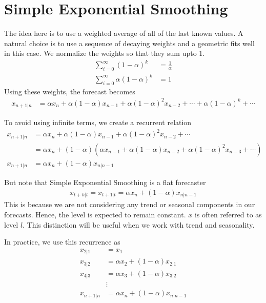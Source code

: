 \documentclass[../../time_series_notes.tex]{subfiles}
\begin{document}
\section{Simple Exponential Smoothing}
The idea here is to use a weighted average of all of the last known values. A natural choice is to use a sequence of decaying weights and a geometric fits well in this case. We normalize the weights so that they sum upto 1.
\begin{align*}
    \sum_{i=0}^{\infty} (1-\alpha)^{k} &= \frac{1}{\alpha}\\
    \sum_{i=0}^{\infty} \alpha(1-\alpha)^{k} &= 1
\end{align*}
Using these weights, the forecast becomes
\begin{align*}
    x_{n+1|n} &= \alpha x_{n} + \alpha(1-\alpha)x_{n-1} + \alpha(1-\alpha)^{2}x_{n-2} + \cdots + \alpha(1-\alpha)^{k} + \cdots
\end{align*}

To avoid using infinite terms, we create a recurrent relation
\begin{align*}
    x_{n+1|n} &= \alpha x_{n} + \alpha(1-\alpha)x_{n-1} + \alpha(1-\alpha)^{2}x_{n-2} + \cdots\\
    &= \alpha x_{n} + (1-\alpha)(\alpha x_{n-1} + \alpha(1-\alpha)x_{n-2} + \alpha(1-\alpha)^{2}x_{n-3} + \cdots)\\
    x_{n+1|n} &= \alpha x_{n} + (1-\alpha)x_{n|n-1}
\end{align*}

But note that Simple Exponential Smoothing is a flat forecaster
\begin{align*}
    x_{t+h|t} = x_{t+1|t} = \alpha x_{n} + (1-\alpha)x_{n|n-1}
\end{align*}
This is because we are not considering any trend or seasonal components in our forecasts. Hence, the level is expected to remain constant. $x$ is often referred to as level $l$. This distinction will be useful when we work with trend and seasonality.\newline

In practice, we use this recurrence as
\begin{align*}
    x_{2|1} &= x_{1}\\
    x_{3|2} &= \alpha x_{2} + (1-\alpha)x_{2|1}\\
    x_{4|3} &= \alpha x_{3} + (1-\alpha)x_{3|2}\\
    &\vdots\\
    x_{n+1|n} &= \alpha x_{n} + (1-\alpha)x_{n|n-1}
\end{align*}
\end{document}
